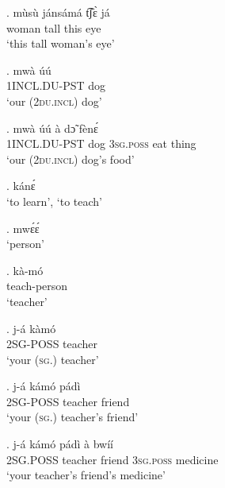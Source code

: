 \documentclass{assets/fieldnotes}
\begin{document}
\exg. mùsù jánsámá t͡ʃɛ̀ já\\
woman tall this eye\\
`this tall woman’s eye’

\exg. mwà úú\\
\textsc{1INCL.DU-PST} dog\\
`our (\textsc{2du.incl}) dog’

\exg. mwà úú à dɔ̃ fènɛ́\\
\textsc{1INCL.DU-PST} dog \textsc{3sg.poss} eat thing\\
`our (\textsc{2du.incl}) dog’s food'

\ex. kánɛ́\\
`to learn’, `to teach’

\ex. mwɛ́ɛ́\\
`person’

\exg. kà-mó\\
teach-person\\
`teacher’\\

\exg. j-á kàmó\\
\textsc{2SG-POSS} teacher\\
`your (\textsc{sg.}) teacher’

\exg. j-á kámó pádì\\
\textsc{2SG-POSS} teacher friend\\
`your (\textsc{sg.}) teacher’s friend’

\exg. j-á kámó pádì à bwíí\\
\textsc{2SG.POSS} teacher friend \textsc{3sg.poss} medicine\\
`your teacher’s friend’s medicine’

\newpage 
\end{document}
